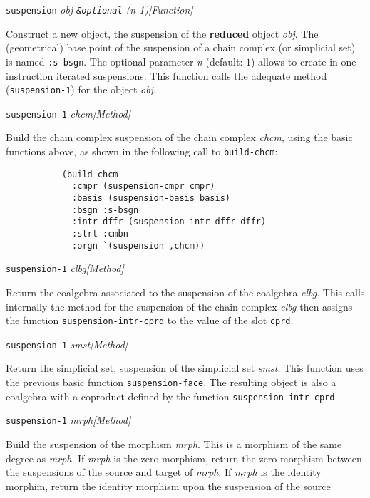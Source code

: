 \newpage
{\parindent=0mm
{\leftskip=5mm 
{\tt suspension} {\em obj {\tt \&optional} (n 1)}\hfill{\em[Function]} \par}
{\leftskip=15mm 
Construct a new object, the suspension of the {\bf reduced} object {\em obj}. 
The (geometrical) base point of the suspension of a chain complex
(or simplicial set) is named  {\tt :s-bsgn}. The optional parameter {\em n} (default: $1$)
allows to create in one instruction iterated suspensions. This function calls the adequate
method ({\tt suspension-1}) for the object {\em obj}.\par}
{\leftskip=5mm 
{\tt suspension-1} {\em chcm}\hfill{\em[Method]} \par}
{\leftskip=15mm 
Build the chain complex suspension of the chain complex {\em chcm}, using the basic functions
above, as shown in the following call to {\tt build-chcm}:
{\footnotesize\begin{verbatim}
           (build-chcm
             :cmpr (suspension-cmpr cmpr)
             :basis (suspension-basis basis)
             :bsgn :s-bsgn
             :intr-dffr (suspension-intr-dffr dffr)
             :strt :cmbn
             :orgn `(suspension ,chcm))
\end{verbatim}} 
\par}
{\leftskip=5mm 
{\tt suspension-1} {\em clbg}\hfill{\em[Method]} \par}
{\leftskip=15mm 
Return the coalgebra associated to the suspension of the coalgebra {\em clbg}.
This calls internally the method for the suspension of the chain complex {\em clbg} then  
assigns the function {\tt suspension-intr-cprd} to the value of the slot {\tt cprd}. \par}
{\leftskip=5mm 
{\tt suspension-1} {\em smst}\hfill{\em[Method]} \par}
{\leftskip=15mm 
Return the simplicial set, suspension of the simplicial set {\em smst}.
This function uses the previous basic function {\tt suspension-face}.
The resulting object is also a coalgebra with a coproduct defined by the
function {\tt suspension-intr-cprd}. \par}
{\leftskip=5mm 
{\tt suspension-1} {\em mrph}\hfill{\em[Method]} \par}
{\leftskip=15mm 
Build the suspension of the morphism {\em mrph}. This is a morphism of the same
degree as {\em mrph}. If {\em mrph} is the zero morphism, return the zero morphism
between the suspensions of the source and target of {\em mrph}. If {\em mrph} is the
identity morphim, return the identity morphism upon the suspension of the source
}}
